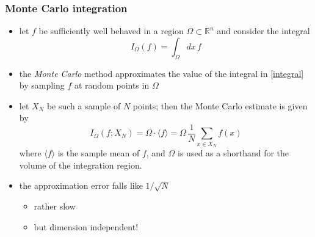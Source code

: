 \begin{frame}[fragile]
%
  \frametitle{Monte Carlo integration}
%
  \begin{itemize}
%
  \item let $f$ be sufficiently well behaved in a region $\Omega \subset \mathbb{R}^{n}$ and
    consider the integral
    \begin{equation}
      I_{\Omega} (f) = \int_{\Omega} dx \, f 
      \label{eq:integral}
    \end{equation}
%
  \item the {\em Monte Carlo} method approximates the value of the integral in \eqref{integral}
    by sampling $f$ at random points in $\Omega$
%
  \item let $X_{N}$ be such a sample of $N$ points; then the Monte Carlo estimate is given by
    \begin{equation}
      I_{\Omega} (f; X_{N})
      =
      \Omega \cdot \langle f \rangle
      =
      \Omega \, \frac{1}{N} \sum_{x \in X_{N}} f(x)
      \label{eq:mc-estimate}
    \end{equation}
%
    where $\langle f \rangle$ is the sample mean of $f$, and $\Omega$ is used as a shorthand
    for the volume of the integration region.
%
  \item the approximation error falls like $1/\sqrt{N}$
    \begin{itemize}
    \item rather slow
    \item but dimension independent!
    \end{itemize}
  \end{itemize}
%
\end{frame}


